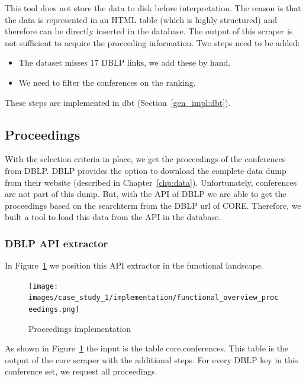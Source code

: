\documentclass{ou-report}
\newcommand{\dblp}{DBLP}
\newcommand{\api}{API}
\begin{document}
This tool does not store the data to disk before interpretation. The reason is 
that the data is represented in an HTML table (which is highly structured) and 
therefore can be directly inserted in the database.
The output of this scraper is not sufficient to acquire the proceeding information. 
Two steps need to be added:
\begin{itemize}
    \item The dataset misses 17 \dblp{} links, we add these by hand.
    \item We need to filter the conferences on the ranking.
\end{itemize}
These steps are implemented in dbt (Section~\ref{gen_impl:dbt}).

\subsection{Proceedings}
With the selection criteria in place, we get the proceedings of the 
conferences from \dblp{}. \dblp{} provides the option to download the complete 
data dump from their website (described in Chapter~\ref{chp:data}). 
Unfortunately, conferences are not part of this dump. But, with the API of 
\dblp{} we are able to get the proceedings based on the searchterm from the 
\dblp{} url of CORE. Therefore, we built a tool to load this data from the 
\api{} in the database.
\subsubsection{DBLP API extractor}
In Figure~\ref{fig:functional_overview_proceedings} we position this \api{} 
extractor in the functional landscape.

\begin{figure}[H]
    \centering
    \texttt{[image: images/case\_study\_1/implementation/functional\_overview\_proceedings.png]}
    \caption{Proceedings implementation}
    \label{fig:functional_overview_proceedings}
\end{figure}

As shown in Figure~\ref{fig:functional_overview_proceedings} the input is the
table core.conferences. This table is the output of the core scraper with the 
additional steps.
For every DBLP key in this conference set, we request all proceedings.
\end{document}
